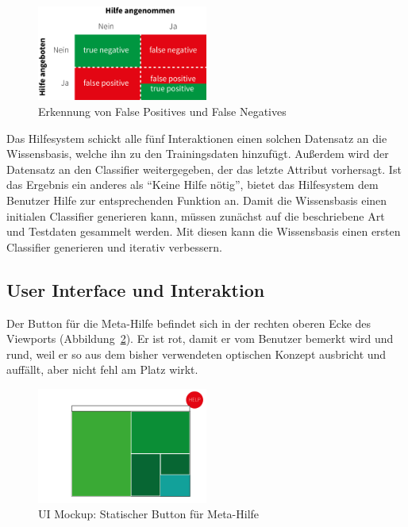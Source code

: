 \documentclass[
	headsepline,
	footsepline,
	fontsize=12pt,
	bibliography=totoc
]{scrbook}
\begin{document}
\begin{figure}[htbp]
   \centering
   \includegraphics[width=0.5\textwidth]{images/konzeption-meta-dyn-id.png}
   \caption{Erkennung von False Positives und False Negatives}
   \label{figure:meta-dyn-id}
\end{figure}

Das Hilfesystem schickt alle fünf Interaktionen einen solchen Datensatz an die Wissensbasis, welche ihn zu den Trainingsdaten hinzufügt. Außerdem wird der Datensatz an den Classifier weitergegeben, der das letzte Attribut vorhersagt. Ist das Ergebnis ein anderes als \enquote{Keine Hilfe nötig}, bietet das Hilfesystem dem Benutzer Hilfe zur entsprechenden Funktion an. Damit die Wissensbasis einen initialen Classifier generieren kann, müssen zunächst auf die beschriebene Art und Testdaten gesammelt werden. Mit diesen kann die Wissensbasis einen ersten Classifier generieren und iterativ verbessern.

\subsection{User Interface und Interaktion}

Der Button für die Meta-Hilfe befindet sich in der rechten oberen Ecke des Viewports (Abbildung~\ref{figure:meta-step1}). Er ist rot, damit er vom Benutzer bemerkt wird und rund, weil er so aus dem bisher verwendeten optischen Konzept ausbricht und auffällt, aber nicht fehl am Platz wirkt.

\begin{figure}[htbp]
   \centering
   \includegraphics[width=0.5\textwidth]{images/konzeption-meta-step1.png}
   \caption{UI Mockup: Statischer Button für Meta-Hilfe}
   \label{figure:meta-step1}
\end{figure}
\end{document}

